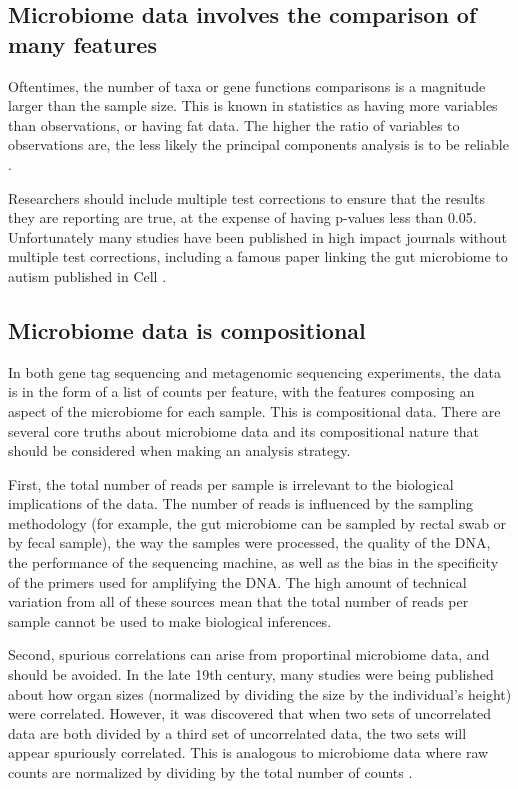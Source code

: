 \subsection{Microbiome data involves the comparison of many features}
Oftentimes, the number of taxa or gene functions comparisons is a magnitude larger than the sample size. This is known in statistics as having more variables than observations, or having fat data. The higher the ratio of variables to observations are, the less likely the principal components analysis is to be reliable \cite{osborne2004sample}.

Researchers should include multiple test corrections to ensure that the results they are reporting are true, at the expense of having p-values less than 0.05. Unfortunately many studies have been published in high impact journals without multiple test corrections, including a famous paper linking the gut microbiome to autism published in Cell \cite{hsiao2013microbiota}.

\subsection{Microbiome data is compositional}
In both gene tag sequencing and metagenomic sequencing experiments, the data is in the form of a list of counts per feature, with the features composing an aspect of the microbiome for each sample. This is compositional data. There are several core truths about microbiome data and its compositional nature that should be considered when making an analysis strategy.

First, the total number of reads per sample is irrelevant to the biological implications of the data. The number of reads is influenced by the sampling methodology (for example, the gut microbiome can be sampled by rectal swab or by fecal sample), the way the samples were processed, the quality of the DNA, the performance of the sequencing machine, as well as the bias in the specificity of the primers used for amplifying the DNA. The high amount of technical variation from all of these sources mean that the total number of reads per sample cannot be used to make biological inferences.

Second, spurious correlations can arise from proportinal microbiome data, and should be avoided. In the late 19th century, many studies were being published about how organ sizes (normalized by dividing the size by the individual's height) were correlated. However, it was discovered that when two sets of uncorrelated data are both divided by a third set of uncorrelated data, the two sets will appear spuriously correlated. This is analogous to microbiome data where raw counts are normalized by dividing by the total number of counts \cite{pearson1896mathematical}.

